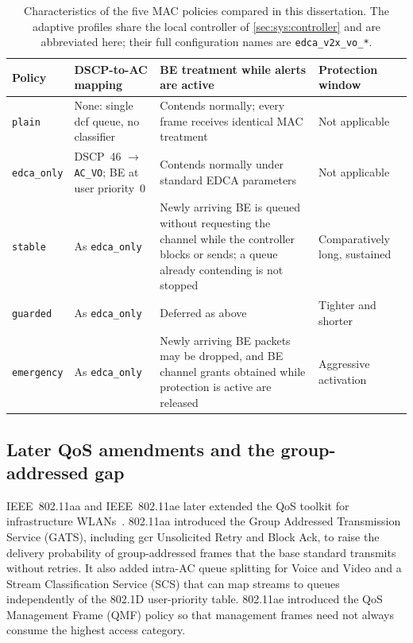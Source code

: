 \begin{table}[htb]
	\ABNTEXfontereduzida
	\caption{\label{tab:bg:policies}Characteristics of the five MAC policies compared in this dissertation. The adaptive profiles share the local controller of \autoref{sec:sys:controller} and are abbreviated here; their full configuration names are \texttt{edca\_v2x\_vo\_*}.}
	\begin{center}
		\begin{tabularx}{\linewidth}{@{}>{\raggedright\arraybackslash}l >{\raggedright\arraybackslash}X >{\raggedright\arraybackslash}X >{\raggedright\arraybackslash}X@{}}
			\toprule
			\textbf{Policy} & \textbf{DSCP-to-AC mapping} & \textbf{BE treatment while alerts are active} & \textbf{Protection window} \\
			\midrule
			\texttt{plain} & None: single \gls{dcf} queue, no classifier & Contends normally; every frame receives identical MAC treatment & Not applicable \\
			\texttt{edca\_only} & DSCP~46 $\rightarrow$ \texttt{AC\_VO}; BE at user priority~0 & Contends normally under standard EDCA parameters & Not applicable \\
			\texttt{stable} & As \texttt{edca\_only} & Newly arriving BE is queued without requesting the channel while the controller blocks or sends; a queue already contending is not stopped & Comparatively long, sustained \\
			\texttt{guarded} & As \texttt{edca\_only} & Deferred as above & Tighter and shorter \\
			\texttt{emergency} & As \texttt{edca\_only} & Newly arriving BE packets may be dropped, and BE channel grants obtained while protection is active are released & Aggressive activation \\
			\bottomrule
		\end{tabularx}
	\end{center}
\end{table}

\subsection{Later QoS amendments and the group-addressed gap}
\label{sec:bg:80211aa}

IEEE~802.11aa and IEEE~802.11ae later extended the QoS toolkit for infrastructure WLANs~\cite{kosekszott2012What}.
802.11aa introduced the Group Addressed Transmission Service (GATS), including \gls{gcr} Unsolicited Retry and  Block Ack, to raise the delivery probability of group-addressed frames that the base standard transmits without retries.
It also added intra-AC queue splitting for Voice and Video and a Stream Classification Service (SCS) that can map streams to queues independently of the 802.1D user-priority table.
802.11ae introduced the QoS Management Frame (QMF) policy so that management frames need not always consume the highest access category.


